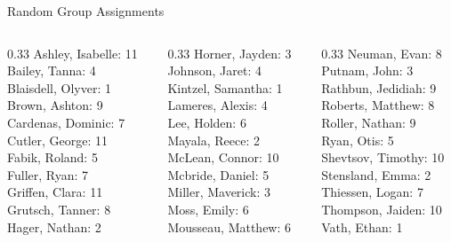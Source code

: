 \documentclass[10pt]{beamer}
\begin{document}
\begin{frame}{Random Group Assignments}
\begin{columns}
\begin{column}{0.33\textwidth}
Ashley, Isabelle: 11 \\ 
Bailey, Tanna: 4 \\ 
Blaisdell, Olyver: 1 \\ 
Brown, Ashton: 9 \\ 
Cardenas, Dominic: 7 \\ 
Cutler, George: 11 \\ 
Fabik, Roland: 5 \\ 
Fuller, Ryan: 7 \\ 
Griffen, Clara: 11 \\ 
Grutsch, Tanner: 8 \\ 
Hager, Nathan: 2 \\\end{column}
\begin{column}{0.33\textwidth}
Horner, Jayden: 3 \\ 
Johnson, Jaret: 4 \\ 
Kintzel, Samantha: 1 \\ 
Lameres, Alexis: 4 \\ 
Lee, Holden: 6 \\ 
Mayala, Reece: 2 \\ 
McLean, Connor: 10 \\ 
Mcbride, Daniel: 5 \\ 
Miller, Maverick: 3 \\ 
Moss, Emily: 6 \\ 
Mousseau, Matthew: 6 \\\end{column}
\begin{column}{0.33\textwidth}
Neuman, Evan: 8 \\ 
Putnam, John: 3 \\ 
Rathbun, Jedidiah: 9 \\ 
Roberts, Matthew: 8 \\ 
Roller, Nathan: 9 \\ 
Ryan, Otis: 5 \\ 
Shevtsov, Timothy: 10 \\ 
Stensland, Emma: 2 \\ 
Thiessen, Logan: 7 \\ 
Thompson, Jaiden: 10 \\ 
Vath, Ethan: 1 \\\end{column}
\end{columns}
\end{frame}
\end{document}
